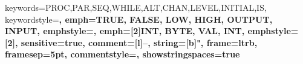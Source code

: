 \newcommand{\webnote}[2]{\footnote{See \url{#1}\xspace for more information about #2.}}
 
{
	keywords={PROC,PAR,SEQ,WHILE,ALT,CHAN,LEVEL,INITIAL,IS},
	keywordstyle=\color{Keyword}\bfseries,
	emph={TRUE, FALSE, LOW, HIGH, OUTPUT, INPUT}, %
	emphstyle=\color{Constant}\bfseries, 
	emph={[2]INT, BYTE, VAL, INT}, %
	emphstyle={[2]\color{Type}},
	sensitive=true,
	comment=[l]{--},
	string=[b]",
	frame=ltrb,
	framesep=5pt,
  commentstyle=\color{Comment},
  showstringspaces=true
}

\parskip 2mm



\renewcommand\lstlistingname{Figure}

\newcommand{\mypi}{$\pi$}
\newcommand{\myPI}{\large$\pi$}
\newcommand{\occam}{{\fontfamily{phv}\selectfont occam-\myPI}\xspace}
\newcommand{\occamone}{{\fontfamily{phv}\selectfont occam1}\xspace}
\newcommand{\justoccam}{{\fontfamily{phv}\selectfont occam}\xspace}
\newcommand{\loccam}{{\fontfamily{phv}\selectfont loccam}}
\newcommand{\inmos}{{\fontfamily{phv}\selectfont inmos}\xspace}

\def\kroc{KR{\sffamily o}C\xspace} 
\newcommand{\tvm}{Transterpreter\xspace}
\newcommand{\Tvm}{Transterpreter\xspace}


\newcommand{\tvmurl}{\url{www.transterpreter.org}\xspace}
\newcommand{\tvmcite}{\cite{transterpreter}}

\newcommand{\ccc}{\url{www.concurrency.cc}\xspace}

\newcommand{\occplug}{occPlug\xspace}

\newcommand{\strong}{\bfseries}

\newcommand{\heartbeat}{{\procname heartbeat}\xspace}
\newcommand{\blink}{{\procname blink}\xspace}
\newcommand{\tp}{{\procname pin.toggle}\xspace}
\newcommand{\bp}{{\procname button.press}\xspace}
\newcommand{\toggle}{{\procname toggle}\xspace}
\newcommand{\digo}{{\procname digital.output}\xspace}
\newcommand{\il}{{\procname invert.level}\xspace}
\newcommand{\tick}{{\procname tick}\xspace}
\newcommand{\pinlevel}{{\procname pin.level}\xspace}
\newcommand{\pwms}{{\procname pwm.simple}\xspace}
\newcommand{\bA}{{\procname beginAnalog}\xspace}
\newcommand{\aW}{{\procname analogWrite}\xspace}

